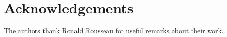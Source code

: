 \hypertarget{acknowledgements}{%
\section{Acknowledgements}\label{acknowledgements}}

The authors thank Ronald Rousseau for useful remarks about their work.



\address{%
Tian-Yuan Huang\\
National Science Library, Chinese Academy of Sciences\\%
Beijing, China\\
%
%
\textit{ORCiD: \href{https://orcid.org/0000-0002-4151-3764}{0000-0002-4151-3764}}\\%
\href{mailto:huangtianyuan@mail.las.ac.cn}{\nolinkurl{huangtianyuan@mail.las.ac.cn}}%
}

\address{%
Liying Yang\\
National Science Library, Chinese Academy of Sciences\\%
Beijing, China\\
%
%
%
\href{mailto:yangly@mail.las.ac.cn}{\nolinkurl{yangly@mail.las.ac.cn}}%
}
